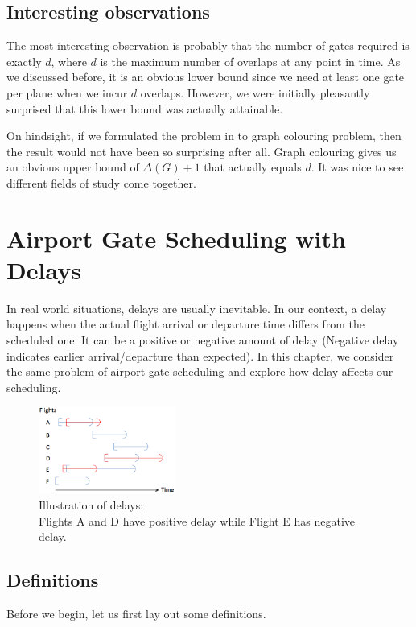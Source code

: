 \documentclass[12pt, a4paper]{report}
\begin{document}
\section{Interesting observations}
The most interesting observation is probably that the number of gates required is exactly $d$, where $d$ is the maximum number of overlaps at any point in time. As we discussed before, it is an obvious lower bound since we need at least one gate per plane when we incur $d$ overlaps. However, we were initially pleasantly surprised that this lower bound was actually attainable.

On hindsight, if we formulated the problem in to graph colouring problem, then the result would not have been so surprising after all. Graph colouring gives us an obvious upper bound of $\Delta(G) + 1$ that actually equals $d$. It was nice to see different fields of study come together.

\chapter{Airport Gate Scheduling with Delays}

In real world situations, delays are usually inevitable. In our context, a delay happens when the actual flight arrival or departure time differs from the scheduled one. It can be a positive or negative amount of delay (Negative delay indicates earlier arrival/departure than expected). In this chapter, we consider the same problem of airport gate scheduling and explore how delay affects our scheduling.

\begin{figure}[h!]
\centering
\includegraphics[width=0.4\textwidth]{../figures/delays.png}
\caption{Illustration of delays:\\ Flights A and D have positive delay while Flight E has negative delay.}
\end{figure}

\section{Definitions}
Before we begin, let us first lay out some definitions.
\end{document}
